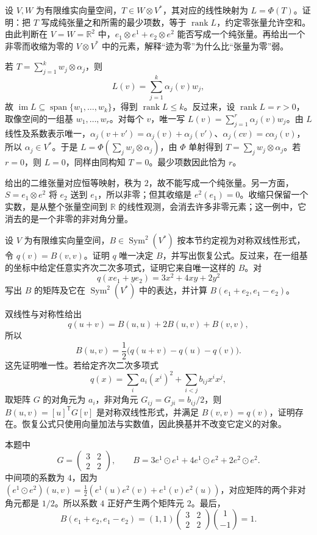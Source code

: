 \begin{exercise}
	\label{g1:exr:1202-tensor-rank}
	设 \(V,W\) 为有限维实向量空间，\(T\in W\otimes V^*\)，其对应的线性映射为 \(L=\Phi(T)\)。证明：把 \(T\) 写成纯张量之和所需的最少项数，等于 \(\operatorname{rank}L\)，约定零张量允许空和。由此判断在 \(V=W=\mathbb R^2\) 中，\(e_1\otimes e^1+e_2\otimes e^2\) 能否写成一个纯张量。再给出一个非零而收缩为零的 \(V\otimes V^*\) 中的元素，解释“迹为零”为什么比“张量为零”弱。
\end{exercise}
\begin{solution}
	若 \(T=\sum_{j=1}^k w_j\otimes\alpha_j\)，则
	\[
		L(v)=\sum_{j=1}^k\alpha_j(v)w_j,
	\]
	故 \(\operatorname{im}L\subseteq\operatorname{span}\{w_1,\ldots,w_k\}\)，得到 \(\operatorname{rank}L\le k\)。反过来，设 \(\operatorname{rank}L=r>0\)，取像空间的一组基 \(w_1,\ldots,w_r\)。对每个 \(v\)，唯一写 \(L(v)=\sum_{j=1}^r\alpha_j(v)w_j\)。由 \(L\) 线性及系数表示唯一，\(\alpha_j(v+v')=\alpha_j(v)+\alpha_j(v')\)、\(\alpha_j(cv)=c\alpha_j(v)\)，所以 \(\alpha_j\in V^*\)。于是 \(L=\Phi(\sum_jw_j\otimes\alpha_j)\)，由 \(\Phi\) 单射得到 \(T=\sum_jw_j\otimes\alpha_j\)。若 \(r=0\)，则 \(L=0\)，同样由同构知 \(T=0\)。最少项数因此恰为 \(r\)。

	给出的二维张量对应恒等映射，秩为 \(2\)，故不能写成一个纯张量。另一方面，\(S=e_1\otimes e^2\) 将 \(e_2\) 送到 \(e_1\)，所以非零；但其收缩是 \(e^2(e_1)=0\)。收缩只保留一个实数，是从整个张量空间到 \(\mathbb R\) 的线性观测，会消去许多非零元素；这一例中，它消去的是一个非零的非对角分量。
\end{solution}

\begin{exercise}
	\label{g1:exr:1202-quadratic-symmetric}
	设 \(V\) 为有限维实向量空间，\(B\in\operatorname{Sym}^2(V^*)\) 按本节约定视为对称双线性形式，令 \(q(v)=B(v,v)\)。证明 \(q\) 唯一决定 \(B\)，并写出恢复公式。反过来，在一组基的坐标中给定任意实齐次二次多项式，证明它来自唯一这样的 \(B\)。对
	\[
		q(xe_1+ye_2)=3x^2+4xy+2y^2
	\]
	写出 \(B\) 的矩阵及它在 \(\operatorname{Sym}^2(V^*)\) 中的表达，并计算 \(B(e_1+e_2,e_1-e_2)\)。
\end{exercise}
\begin{solution}
	双线性与对称性给出
	\[
		q(u+v)=B(u,u)+2B(u,v)+B(v,v),
	\]
	所以
	\[
		B(u,v)=\frac12\bigl(q(u+v)-q(u)-q(v)\bigr).
	\]
	这先证明唯一性。若给定齐次二次多项式
	\[
		q(x)=\sum_i a_i(x^i)^2+\sum_{i<j}b_{ij}x^ix^j,
	\]
	取矩阵 \(G\) 的对角元为 \(a_i\)，非对角元 \(G_{ij}=G_{ji}=b_{ij}/2\)，则 \(B(u,v)=[u]^{\mathsf T}G[v]\) 是对称双线性形式，并满足 \(B(v,v)=q(v)\)，证明存在。恢复公式只使用向量加法与实数值，因此换基并不改变它定义的对象。

	本题中
	\[
		G=\begin{pmatrix}3&2\\2&2\end{pmatrix},\qquad
		B=3e^1\odot e^1+4e^1\odot e^2+2e^2\odot e^2.
	\]
	中间项的系数为 \(4\)，因为 \((e^1\odot e^2)(u,v)=\tfrac12(e^1(u)e^2(v)+e^1(v)e^2(u))\)，对应矩阵的两个非对角元都是 \(1/2\)。所以系数 \(4\) 正好产生两个矩阵元 \(2\)。最后，
	\[
		B(e_1+e_2,e_1-e_2)
		=(1,1)\begin{pmatrix}3&2\\2&2\end{pmatrix}\binom{1}{-1}=1.
	\]
\end{solution}

